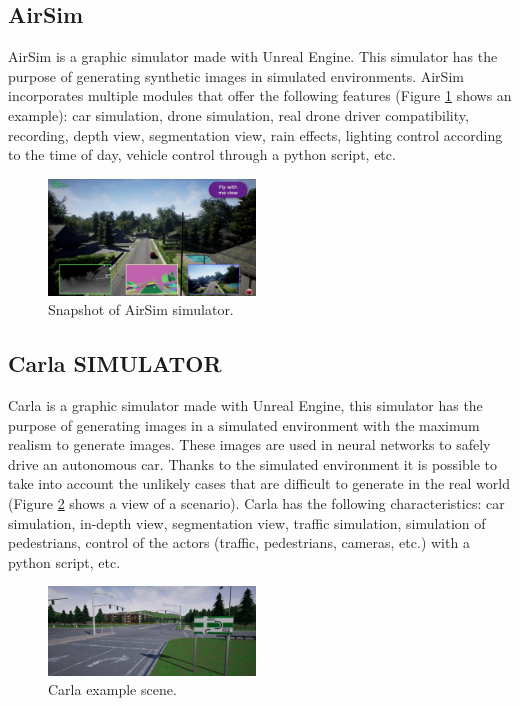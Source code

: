 \documentclass[10pt,a4paper,twocolumn,twoside]{article}
\begin{document}
\subsection{AirSim}
AirSim is a graphic simulator made with Unreal Engine. This simulator has the purpose of generating synthetic images in simulated environments. AirSim incorporates multiple modules that offer the following features (Figure \ref{fig-airsim} shows an example): car simulation, drone simulation, real drone driver compatibility, recording, depth view, segmentation view, rain effects, lighting control according to the time of day, vehicle control through a python script, etc.

\begin{figure}[h]
\centering
  	\includegraphics[width=0.49\textwidth]{airsim}
	\caption{Snapshot of AirSim simulator.}
	\label{fig-airsim}
\end{figure}

\subsection{Carla SIMULATOR}

Carla is a graphic simulator made with Unreal Engine, this simulator has the purpose of generating images in a simulated environment with the maximum realism to generate images. These images are used in neural networks to safely drive an autonomous car. Thanks to the simulated environment it is possible to take into account the unlikely cases that are difficult to generate in the real world (Figure \ref{fig-carla} shows a view of a scenario). Carla has the following characteristics: car simulation, in-depth view, segmentation view, traffic simulation, simulation of pedestrians, control of the actors (traffic, pedestrians, cameras, etc.) with a python script, etc.

\begin{figure}[h]
\centering
  	\includegraphics[width=0.49\textwidth]{carlatown}
	\caption{Carla example scene.}
	\label{fig-carla}
\end{figure}
\end{document}
